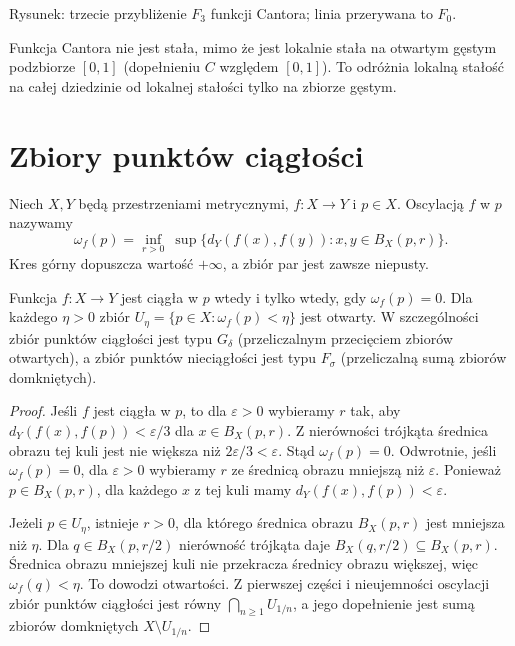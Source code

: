 \begin{center}

\small Rysunek: trzecie przybliżenie $F_3$ funkcji Cantora; linia przerywana to $F_0$.
\end{center}
Funkcja Cantora nie jest stała, mimo że jest lokalnie stała na otwartym gęstym podzbiorze $[0,1]$ (dopełnieniu $C$ względem $[0,1]$). To odróżnia lokalną stałość na całej dziedzinie od lokalnej stałości tylko na zbiorze gęstym.

\section{Zbiory punktów ciągłości}
\begin{definicja}
\label{ma1:def:point-oscillation}
Niech $X,Y$ będą przestrzeniami metrycznymi, $f:X\to Y$ i $p\in X$. Oscylacją $f$ w $p$ nazywamy
\[
 \omega_f(p)=\inf_{r>0}\ \sup\{d_Y(f(x),f(y)):x,y\in B_X(p,r)\}.
\]
Kres górny dopuszcza wartość $+\infty$, a zbiór par jest zawsze niepusty.
\end{definicja}
\begin{twierdzenie}
\label{ma1:thm:continuity-gdelta}
Funkcja $f:X\to Y$ jest ciągła w $p$ wtedy i tylko wtedy, gdy $\omega_f(p)=0$. Dla każdego $\eta>0$ zbiór $U_\eta=\{p\in X:\omega_f(p)<\eta\}$ jest otwarty. W szczególności zbiór punktów ciągłości jest typu $G_\delta$ (przeliczalnym przecięciem zbiorów otwartych), a zbiór punktów nieciągłości jest typu $F_\sigma$ (przeliczalną sumą zbiorów domkniętych).
\end{twierdzenie}
\begin{proof}
Jeśli $f$ jest ciągła w $p$, to dla $\varepsilon>0$ wybieramy $r$ tak, aby $d_Y(f(x),f(p))<\varepsilon/3$ dla $x\in B_X(p,r)$. Z nierówności trójkąta średnica obrazu tej kuli jest nie większa niż $2\varepsilon/3<\varepsilon$. Stąd $\omega_f(p)=0$. Odwrotnie, jeśli $\omega_f(p)=0$, dla $\varepsilon>0$ wybieramy $r$ ze średnicą obrazu mniejszą niż $\varepsilon$. Ponieważ $p\in B_X(p,r)$, dla każdego $x$ z tej kuli mamy $d_Y(f(x),f(p))<\varepsilon$.

Jeżeli $p\in U_\eta$, istnieje $r>0$, dla którego średnica obrazu $B_X(p,r)$ jest mniejsza niż $\eta$. Dla $q\in B_X(p,r/2)$ nierówność trójkąta daje $B_X(q,r/2)\subseteq B_X(p,r)$. Średnica obrazu mniejszej kuli nie przekracza średnicy obrazu większej, więc $\omega_f(q)<\eta$. To dowodzi otwartości. Z pierwszej części i nieujemności oscylacji zbiór punktów ciągłości jest równy $\bigcap_{n\ge1}U_{1/n}$, a jego dopełnienie jest sumą zbiorów domkniętych $X\setminus U_{1/n}$.
\end{proof}

